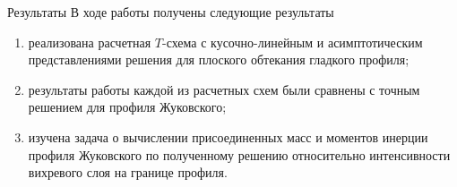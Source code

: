 \documentclass[ignoreonframetext,unicode]{beamer}
\begin{document}
\begin{frame}{Результаты}
	В ходе работы получены следующие результаты
	\begin{block}{}
	\begin{enumerate}
		\item реализована расчетная $T$-схема с  кусочно-линейным и асимптотическим представлениями решения для плоского обтекания гладкого профиля;	
		\item результаты работы каждой из расчетных схем были сравнены с точным решением для профиля Жуковского;
		\item изучена задача о вычислении присоединенных масс и моментов инерции профиля Жуковского по полученному решению относительно интенсивности вихревого слоя на границе профиля.
	\end{enumerate}
	\end{block}	
\end{frame}	
\end{document}

